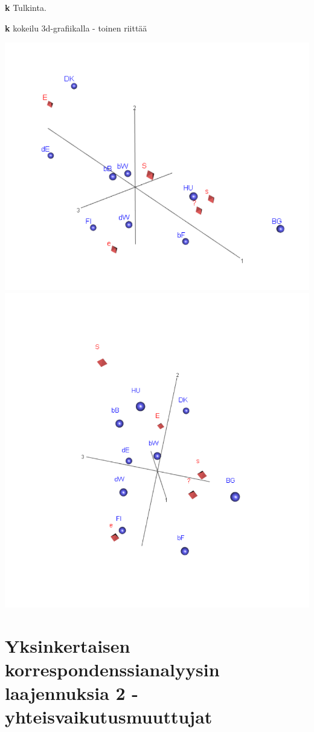\documentclass[
  finnish,
]{book}
\begin{document}
\textbf{k} Tulkinta.

\textbf{k} kokeilu 3d-grafiikalla - toinen riittää

\includegraphics[width=11.07in]{img/3dSymMap_1}
\includegraphics[width=12.36in]{img/3dSymMap_2}

\hypertarget{yksinkertaisen-korrespondenssianalyysin-laajennuksia-2---yhteisvaikutusmuuttujat}{%
\chapter{Yksinkertaisen korrespondenssianalyysin laajennuksia 2 -
yhteisvaikutusmuuttujat}\label{yksinkertaisen-korrespondenssianalyysin-laajennuksia-2---yhteisvaikutusmuuttujat}}
\end{document}
